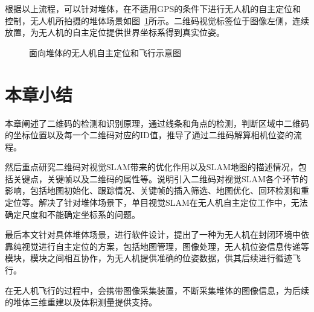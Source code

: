 根据以上流程，可以针对堆体，在不适用GPS的条件下进行无人机的自主定位和控制，无人机所拍摄的堆体场景如图~\ref{fig:2VSLAM_big}所示。二维码视觉标签位于图像左侧，连续放置，为无人机的自主定位提供世界坐标系得到真实位姿。
\begin{figure}[t]
  \centering
    \vskip0.2cm
    \vskip0.2cm      
  \vskip0.2cm

  \caption{面向堆体的无人机自主定位和飞行示意图}\label{fig:2VSLAM_big}
\end{figure}





\section{本章小结}
\label{sec:2.5}
本章阐述了二维码的检测和识别原理，通过线条和角点的检测，判断区域中二维码的坐标位置以及每一个二维码对应的ID值，推导了通过二维码解算相机位姿的流程。

然后重点研究二维码对视觉SLAM带来的优化作用以及SLAM地图的描述情况，包括关键点，关键帧以及二维码的属性等。说明引入二维码对视觉SLAM各个环节的影响，包括地图初始化、跟踪情况、关键帧的插入筛选、地图优化、回环检测和重定位等。解决了针对堆体场景下，单目视觉SLAM在无人机自主定位工作中，无法确定尺度和不能确定坐标系的问题。

最后本文针对具体堆体场景，进行软件设计，提出了一种为无人机在封闭环境中依靠纯视觉进行自主定位的方案，包括地图管理，图像处理，无人机位姿信息传递等模块，模块之间相互协作，为无人机提供准确的位姿数据，供其后续进行循迹飞行。

在无人机飞行的过程中，会携带图像采集装置，不断采集堆体的图像信息，为后续的堆体三维重建以及体积测量提供支持。 
